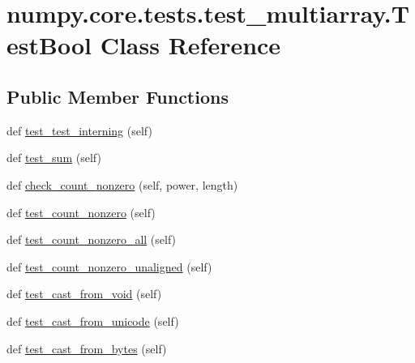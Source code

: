 \hypertarget{classnumpy_1_1core_1_1tests_1_1test__multiarray_1_1TestBool}{}\section{numpy.\+core.\+tests.\+test\+\_\+multiarray.\+Test\+Bool Class Reference}
\label{classnumpy_1_1core_1_1tests_1_1test__multiarray_1_1TestBool}
\subsection*{Public Member Functions}
\begin{DoxyCompactItemize}
\item 
def \hyperlink{classnumpy_1_1core_1_1tests_1_1test__multiarray_1_1TestBool_a58e04e674ec478651e794a9ea22f434c}{test\+\_\+test\+\_\+interning} (self)
\item 
def \hyperlink{classnumpy_1_1core_1_1tests_1_1test__multiarray_1_1TestBool_a6bbff83713210947cac1493c15a8e722}{test\+\_\+sum} (self)
\item 
def \hyperlink{classnumpy_1_1core_1_1tests_1_1test__multiarray_1_1TestBool_af4cd2a8b909872fc8a632406a6eb6956}{check\+\_\+count\+\_\+nonzero} (self, power, length)
\item 
def \hyperlink{classnumpy_1_1core_1_1tests_1_1test__multiarray_1_1TestBool_aa7aa660cd30618d12d7a0fa3e331906c}{test\+\_\+count\+\_\+nonzero} (self)
\item 
def \hyperlink{classnumpy_1_1core_1_1tests_1_1test__multiarray_1_1TestBool_a35c9dd9d341bc74fbe52e964cbbd8860}{test\+\_\+count\+\_\+nonzero\+\_\+all} (self)
\item 
def \hyperlink{classnumpy_1_1core_1_1tests_1_1test__multiarray_1_1TestBool_a91f81b140c8d5c915df0e4589b62b6f3}{test\+\_\+count\+\_\+nonzero\+\_\+unaligned} (self)
\item 
def \hyperlink{classnumpy_1_1core_1_1tests_1_1test__multiarray_1_1TestBool_ac56e66562911e3f5cac6828fb1981015}{test\+\_\+cast\+\_\+from\+\_\+void} (self)
\item 
def \hyperlink{classnumpy_1_1core_1_1tests_1_1test__multiarray_1_1TestBool_afcbeb2b259d461ba33fd5310f8ca0812}{test\+\_\+cast\+\_\+from\+\_\+unicode} (self)
\item 
def \hyperlink{classnumpy_1_1core_1_1tests_1_1test__multiarray_1_1TestBool_a0f0f3901821caa577edb45c5e40dcfc0}{test\+\_\+cast\+\_\+from\+\_\+bytes} (self)
\end{DoxyCompactItemize}
